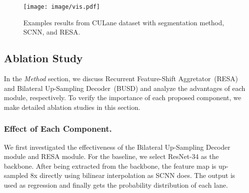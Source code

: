 \documentclass[letterpaper]{article} \usepackage{aaai21}  \usepackage{times}  \usepackage{helvet} \usepackage{courier}  \usepackage[hyphens]{url}  \usepackage{graphicx} \urlstyle{rm} \def\UrlFont{\rm}  \usepackage{natbib}  \usepackage{caption} \frenchspacing  \setlength{\pdfpagewidth}{8.5in}  \setlength{\pdfpageheight}{11in}  \usepackage{amsmath}
\begin{document}
\begin{table}[!tbh]
\centering
{}
\caption{Comparison with state-of-the-art results on Tusimple dataset. ResNet-18/34 indicates deeplab~\citep{chen2017deeplab} using resnet18 and resnet34 as backbone.}
\label{tusimple_main}
\end{table}


\begin{figure}[!t]
\centering
\texttt{[image: image/vis.pdf]}
\caption{Examples results from CULane dataset with segmentation method, SCNN, and RESA.}
\label{result}
\vspace{-10pt}
\end{figure}

\subsection{Ablation Study}
In the \textit{Method} section, we discuss Recurrent Feature-Shift Aggretator~(RESA) and Bilateral Up-Sampling Decoder~(BUSD) and analyze the advantages of each module, respectively. To verify the importance of each proposed component, we make detailed ablation studies in this section.

\subsubsection{Effect of Each Component.}
We first investigated the effectiveness of the Bilateral Up-Sampling Decoder module and RESA module. For the baseline, we select ResNet-34 as the backbone. After being extracted from the backbone, the feature map is up-sampled 8x directly using bilinear interpolation as SCNN does. The output is used as regression and finally gets the probability distribution of each lane. 
\end{document}
